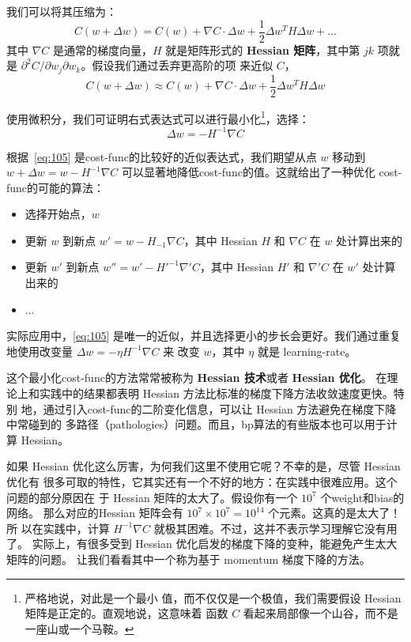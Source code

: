我们可以将其压缩为：
\begin{equation}
  C(w+\Delta w) = C(w) + \nabla C \cdot \Delta w +
  \frac{1}{2} \Delta w^T H \Delta w + \ldots
  \label{eq:104}\tag{104}
\end{equation}
其中 $\nabla C$ 是通常的梯度向量，$H$ 就是矩阵形式的 \textbf{Hessian 矩阵}，其中第
$jk$ 项就是 $\partial^2 C/\partial w_j\partial w_k$。假设我们通过丢弃更高阶的项
来近似 $C$，
\begin{equation} 
  C(w+\Delta w) \approx C(w) + \nabla C \cdot \Delta w +
  \frac{1}{2} \Delta w^T H \Delta w
  \label{eq:105}\tag{105}
\end{equation}

使用微积分，我们可证明右式表达式可以进行最小化\footnote{严格地说，对此是一个最小
  值，而不仅仅是一个极值，我们需要假设 Hessian 矩阵是正定的。直观地说，这意味着
  函数 $C$ 看起来局部像一个山谷，而不是一座山或一个马鞍。}，选择：
\begin{equation}
  \Delta w = -H^{-1} \nabla C
  \label{eq:106}\tag{106}
\end{equation}

根据~\eqref{eq:105} 是\gls*{cost-func}的比较好的近似表达式，我们期望从点 $w$ 移动到
$w+\Delta w = w - H^{-1}\nabla C$ 可以显著地降低\gls*{cost-func}的值。这就给出了一种优化
\gls*{cost-func}的可能的算法：
\begin{itemize}
\item 选择开始点，$w$
\item 更新 $w$ 到新点 $w' = w - H_{-1}\nabla C$，其中 Hessian $H$ 和 $\nabla C$
  在 $w$ 处计算出来的
\item 更新 $w'$ 到新点 $w'' = w' - H'^{-1}\nabla' C$，其中 Hessian $H'$ 和
  $\nabla' C$ 在 $w'$ 处计算出来的
\item $\ldots$
\end{itemize}

实际应用中，\eqref{eq:105} 是唯一的近似，并且选择更小的步长会更好。我们通过重复
地使用改变量 $\Delta w = -\eta H^{-1} \nabla C$ 来 改变 $w$，其中 $\eta$ 就是
\gls*{learning-rate}。

这个最小化\gls*{cost-func}的方法常常被称为 \textbf{Hessian 技术}或者 \textbf{Hessian 优化}。
在理论上和实践中的结果都表明 Hessian 方法比标准的梯度下降方法收敛速度更快。特别
地，通过引入\gls*{cost-func}的二阶变化信息，可以让 Hessian 方法避免在梯度下降中常碰到的
多路径（pathologies）问题。而且，\gls*{bp}算法的有些版本也可以用于计算 Hessian。

如果 Hessian 优化这么厉害，为何我们这里不使用它呢？不幸的是，尽管 Hessian 优化有
很多可取的特性，它其实还有一个不好的地方：在实践中很难应用。这个问题的部分原因在
于 Hessian 矩阵的太大了。假设你有一个 $10^7$ 个\gls*{weight}和\gls*{bias}的网络。
那么对应的Hessian 矩阵会有 $10^7 \times 10^7=10^{14}$ 个元素。这真的是太大了！所
以在实践中，计算 $H^{-1}\nabla C$ 就极其困难。不过，这并不表示学习理解它没有用了。
实际上，有很多受到 Hessian 优化启发的梯度下降的变种，能避免产生太大矩阵的问题。
让我们看看其中一个称为基于 momentum 梯度下降的方法。\\

